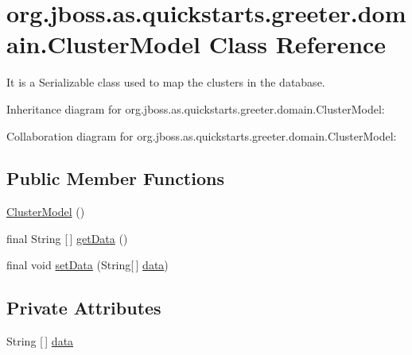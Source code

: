 \hypertarget{classorg_1_1jboss_1_1as_1_1quickstarts_1_1greeter_1_1domain_1_1_cluster_model}{}\section{org.\+jboss.\+as.\+quickstarts.\+greeter.\+domain.\+Cluster\+Model Class Reference}
\label{classorg_1_1jboss_1_1as_1_1quickstarts_1_1greeter_1_1domain_1_1_cluster_model}


It is a Serializable class used to map the clusters in the database.  




Inheritance diagram for org.\+jboss.\+as.\+quickstarts.\+greeter.\+domain.\+Cluster\+Model\+:


Collaboration diagram for org.\+jboss.\+as.\+quickstarts.\+greeter.\+domain.\+Cluster\+Model\+:
\subsection*{Public Member Functions}
\begin{DoxyCompactItemize}
\item 
\hyperlink{classorg_1_1jboss_1_1as_1_1quickstarts_1_1greeter_1_1domain_1_1_cluster_model_a3d821af353b398c137947265ecee312c}{Cluster\+Model} ()
\item 
final String \mbox{[}$\,$\mbox{]} \hyperlink{classorg_1_1jboss_1_1as_1_1quickstarts_1_1greeter_1_1domain_1_1_cluster_model_aa3b81664a16e90dfedbbd50d910432fe}{get\+Data} ()
\item 
final void \hyperlink{classorg_1_1jboss_1_1as_1_1quickstarts_1_1greeter_1_1domain_1_1_cluster_model_a13a912b31c254fe0952c79603f85d06c}{set\+Data} (String\mbox{[}$\,$\mbox{]} \hyperlink{classorg_1_1jboss_1_1as_1_1quickstarts_1_1greeter_1_1domain_1_1_cluster_model_aaa682048e226fc087fca2be21e1dd4fe}{data})
\end{DoxyCompactItemize}
\subsection*{Private Attributes}
\begin{DoxyCompactItemize}
\item 
String \mbox{[}$\,$\mbox{]} \hyperlink{classorg_1_1jboss_1_1as_1_1quickstarts_1_1greeter_1_1domain_1_1_cluster_model_aaa682048e226fc087fca2be21e1dd4fe}{data}
\end{DoxyCompactItemize}
